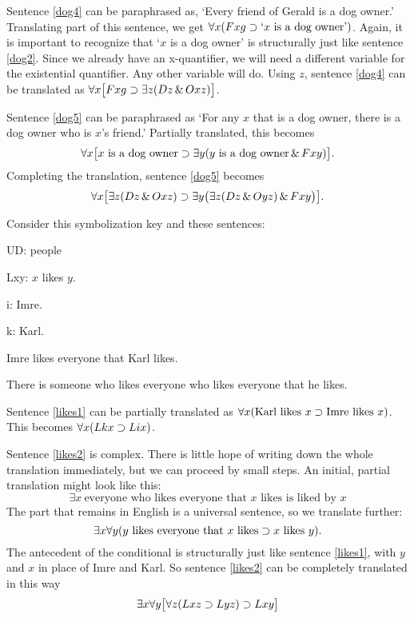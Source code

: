 Sentence \ref{dog4} can be paraphrased as, `Every friend of Gerald is a dog owner.' Translating part of this sentence, we get $\forall x(Fxg \supset\mbox{`$x$ is a dog owner'})$. Again, it is important to recognize that `$x$ is a dog owner' is structurally just like sentence \ref{dog2}. Since we already have an x-quantifier, we will need a different variable for the existential quantifier. Any other variable will do. Using $z$, sentence \ref{dog4} can be translated as $\forall x\bigl[Fxg \supset\exists z(Dz \,\&\, Oxz)\bigr]$.

Sentence \ref{dog5} can be paraphrased as `For any $x$ that is a dog owner, there is a dog owner who is $x$'s friend.' Partially translated, this becomes $$\forall x\bigl[\mbox{$x$ is a dog owner}\supset\exists y(\mbox{$y$ is a dog owner}\,\&\, Fxy)\bigr].$$ Completing the translation, sentence \ref{dog5} becomes $$\forall x\bigl[\exists z(Dz \,\&\, Oxz)\supset\exists y\bigl(\exists z(Dz \,\&\, Oyz)\,\&\, Fxy\bigr)\bigr].$$

Consider this symbolization key and these sentences:
\begin{ekey}
\item[UD:] people
\item[Lxy:] $x$ likes $y$.
\item[i:] Imre.
\item[k:] Karl.
\end{ekey}
\begin{earg}
\item[\ex{likes1}]Imre likes everyone that Karl likes.
\item[\ex{likes2}]There is someone who likes everyone who likes everyone that he likes.
\end{earg}

Sentence \ref{likes1} can be partially translated as $\forall x(\mbox{Karl likes $x$}\supset\mbox{Imre likes $x$})$. This becomes $\forall x(Lkx\supset Lix)$.


Sentence \ref{likes2} is complex. There is little hope of writing down the whole translation immediately, but we can proceed by small steps. An initial, partial translation might look like this: $$\exists x\ \mbox{everyone who likes everyone that $x$ likes is liked by $x$}$$
The part that remains in English is a universal sentence, so we translate further: $$\exists x\forall y(\mbox{$y$ likes everyone that $x$ likes}\supset\mbox{$x$ likes $y$}).$$
The antecedent of the conditional is structurally just like sentence \ref{likes1}, with $y$ and $x$ in place of Imre and Karl. So sentence \ref{likes2} can be completely translated in this way $$\exists x\forall y\bigl[\forall z(Lxz \supset Lyz) \supset Lxy\bigr]$$

